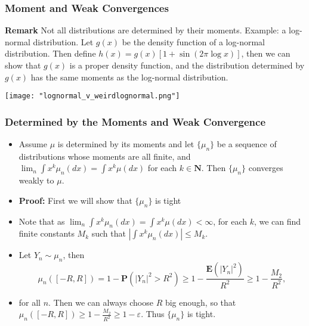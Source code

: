 \documentclass[handout]{beamer}
\newcommand{\BP}{\mathbf{P}}
\newcommand{\BE}{\mathbf{E}}
\begin{document}
\frame
{
  \frametitle{Moment and Weak Convergences}


\textbf{Remark} Not all distributions are determined by their moments. Example: a log-normal distribution. Let $g(x)$ be the density function of a log-normal distribution. Then define $h(x)=g(x) [1+\sin (2\pi \log x)]$, then we can show that $g(x)$ is a proper density function, and the distribution determined by $g(x)$ has the same moments as the log-normal distribution. 

\texttt{[image: "lognormal\_v\_weirdlognormal.png"]}

 }



   \frame
{
  \frametitle{Determined by the Moments and Weak Convergence}

 \begin{itemize}

\item<1->[]\begin{Theorem}[11.4.1]Assume $\mu$ is determined by its moments and let $\{\mu_n\}$ be a sequence of distributions whose moments are all finite, and $\lim_n \int x^k \mu_n(dx)=\int x^k \mu(dx)$ for each $k\in \mathbf{N}$. Then $\{\mu_n\}$ converges weakly to $\mu$. 
\end{Theorem}

\item<2-> \textbf{Proof:} First we will show that $\{\mu_n\}$ is tight

\item<3->[-] Note that as $\lim_n \int x^k \mu_n(dx)=\int x^k \mu(dx)<\infty$, for each $k$, we can find finite constants $M_k$ such that $|\int x^k \mu_n(dx)| \leq M_k$. 

\item<4->[-] Let $Y_n\sim \mu_n$, then 
$$\mu_n([-R, R])=1-\BP(|Y_n|^2>R^2)\geq 1-\frac{\BE(|Y_n|^2)}{R^2}\geq 1-\frac{M_2}{R^2},$$

\item<5-> for all $n$. Then we can always choose $R$ big enough, so that $\mu_n([-R, R])\geq 1-\frac{M_2}{R^2}\geq 1-\varepsilon$. Thus $\{\mu_n\}$ is tight.


\end{itemize}
 }
\end{document}
